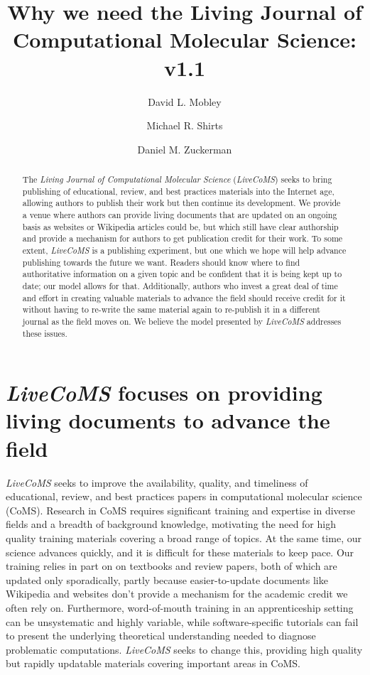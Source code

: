 \documentclass[9pt,editorial]{livecoms}
\title{Why we need the Living Journal of Computational Molecular Science: v1.1}
\author[1*]{David L. Mobley}
\author[2*]{Michael R. Shirts}
\author[3*]{Daniel M. Zuckerman}
\affil[1]{Department of Pharmaceutical Sciences and Chemistry, University of California, Irvine}
\affil[2]{Department of Chemical and Biological Engineering, University of Colorado Boulder}
\affil[2]{Department of Biomedical Engineering, Oregon Health Sciences University}
\begin{document}
\begin{frontmatter}

\maketitle

\begin{abstract}
The \emph{Living Journal of Computational Molecular Science} (\emph{LiveCoMS}) seeks to bring publishing of educational, review, and best practices materials into the Internet age, allowing authors to publish their work but then continue its development.
We provide a venue where authors can provide living documents that are updated on an ongoing basis as websites or Wikipedia articles could be, but which still have clear authorship and provide a mechanism for authors to get publication credit for their work.
To some extent, \emph{LiveCoMS} is a publishing experiment, but one which we hope will help advance publishing towards the future we want.
Readers should know where to find authoritative information on a given topic and be confident that it is being kept up to date; our model allows for that. 
Additionally, authors who invest a great deal of time and effort in creating valuable materials to advance the field should receive credit for it without having to re-write the same material again to re-publish it in a different journal as the field moves on. 
We believe the model presented by \emph{LiveCoMS} addresses these issues.
\end{abstract}
\end{frontmatter}

\section{\emph{LiveCoMS} focuses on providing living documents to advance the field}

\emph{LiveCoMS} seeks to improve the availability, quality, and timeliness of educational, review, and best practices papers in computational molecular science (CoMS).
Research in CoMS requires significant training and expertise in diverse fields and a breadth of background knowledge, motivating the need for high quality training materials covering a broad range of topics.
At the same time, our science advances quickly, and it is difficult for these materials to keep pace. 
Our training relies in part on on textbooks and review papers, both of which are updated only sporadically, partly because easier-to-update documents like Wikipedia and websites don't provide a mechanism for the academic credit we often rely on.
Furthermore, word-of-mouth training in an apprenticeship setting can be unsystematic and highly variable, while software-specific tutorials can fail to present the underlying theoretical understanding needed to diagnose problematic computations.
\emph{LiveCoMS} seeks to change this, providing high quality but rapidly updatable materials covering important areas in CoMS.
\end{document}

